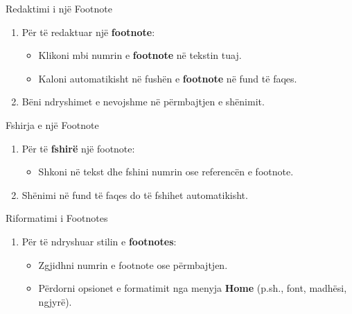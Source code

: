 \documentclass[
  ignorenonframetext,
]{beamer}
\providecommand{\tightlist}{%
  \setlength{\itemsep}{0pt}\setlength{\parskip}{0pt}}
\begin{document}
\begin{frame}{Redaktimi i një Footnote}
\label{redaktimi-i-njuxeb-footnote}
\begin{enumerate}
\item
  Për të redaktuar një \textbf{footnote}:

  \begin{itemize}
  \item
    Klikoni mbi numrin e \textbf{footnote} në tekstin tuaj.
  \item
    Kaloni automatikisht në fushën e \textbf{footnote} në fund të faqes.
  \end{itemize}
\item
  Bëni ndryshimet e nevojshme në përmbajtjen e shënimit.
\end{enumerate}
\end{frame}

\begin{frame}{Fshirja e një Footnote}
\label{fshirja-e-njuxeb-footnote}
\begin{enumerate}
\item
  Për të \textbf{fshirë} një footnote:

  \begin{itemize}
  \tightlist
  \item
    Shkoni në tekst dhe fshini numrin ose referencën e footnote.
  \end{itemize}
\item
  Shënimi në fund të faqes do të fshihet automatikisht.
\end{enumerate}
\end{frame}

\begin{frame}{Riformatimi i Footnotes}
\label{riformatimi-i-footnotes}
\begin{enumerate}
\item
  Për të ndryshuar stilin e \textbf{footnotes}:

  \begin{itemize}
  \item
    Zgjidhni numrin e footnote ose përmbajtjen.
  \item
    Përdorni opsionet e formatimit nga menyja \textbf{Home} (p.sh.,
    font, madhësi, ngjyrë).
  \end{itemize}
\end{enumerate}
\end{frame}
\end{document}
